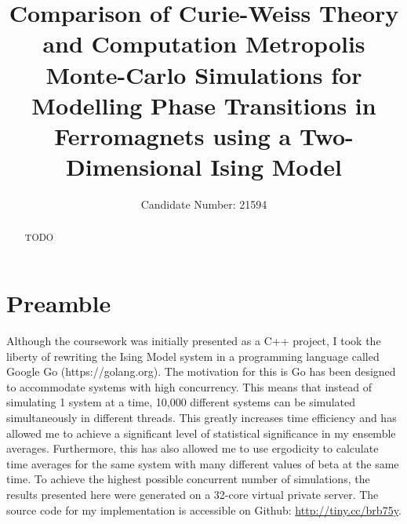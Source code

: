 \documentclass[11pt]{iopart}
\begin{document}
\section*{Preamble}
Although the coursework was initially presented as a C++ project, I took the liberty of rewriting the Ising Model system in a programming language called Google Go (https://golang.org). The motivation for this is Go has been designed to accommodate systems with high concurrency. This means that instead of simulating 1 system at a time, 10,000 different systems can be simulated simultaneously in different threads. This greatly increases time efficiency and has allowed me to achieve a significant level of statistical significance in my ensemble averages. Furthermore, this has also allowed me to use ergodicity to calculate time averages for the same system with many different values of beta at the same time. To achieve the highest possible concurrent number of simulations, the results presented here were generated on a 32-core virtual private server. The source code for my implementation is accessible on Github: \url{http://tiny.cc/brb75y}.\cleardoublepage

\setlength{\marginparwidth}{1.5cm}

\title[]{Comparison of Curie-Weiss Theory and Computation Metropolis Monte-Carlo Simulations for Modelling Phase Transitions in Ferromagnets using a Two-Dimensional Ising Model}

\author{Candidate Number: 21594}

\address{Department of Physics,
University of Bath, Bath BA2 7AY, United Kingdom}
\begin{abstract}
TODO
\end{abstract}


\end{document}
